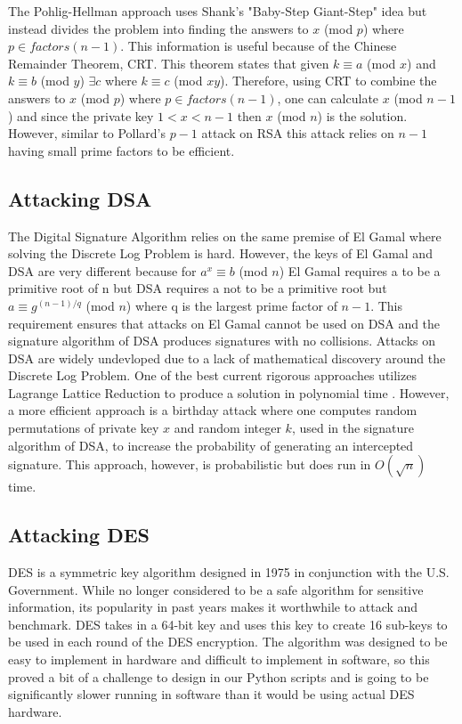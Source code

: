 \documentclass[12pt]{report}
\begin{document}
The Pohlig-Hellman approach uses Shank's "Baby-Step Giant-Step" idea but instead divides the problem into finding the answers to $x$ (mod $p$) where
$p \in factors(n-1)$. This information is useful because of the Chinese Remainder Theorem, CRT. This theorem states that given $k \equiv a$ (mod $x$) and
$k \equiv b$ (mod $y$) $\exists c$ where $k \equiv c$ (mod $xy$). Therefore, using CRT to combine the answers to $x$ (mod $p$) where $p \in factors(n-1)$, one can
calculate $x$ (mod $n-1$) and since the private key $1 < x < n-1$ then $x$ (mod $n$) is the solution. However, similar to Pollard's $p-1$ attack on RSA this attack
relies on $n-1$ having small prime factors to be efficient.

\subsection{Attacking DSA}
The Digital Signature Algorithm relies on the same premise of El Gamal where solving the Discrete Log Problem is hard. However, the keys of El Gamal and DSA are
very different because for $a^{x} \equiv b$ (mod $n$) El Gamal requires a to be a primitive root of n but DSA requires a not to be a primitive root but
$a \equiv g^{(n-1)/q}$ (mod $n$) where q is the largest prime factor of $n-1$. This requirement ensures that attacks on El Gamal cannot be used on DSA and the
signature algorithm of DSA produces signatures with no collisions. Attacks on DSA are widely undevloped due to a lack of mathematical discovery around the Discrete
Log Problem. One of the best current rigorous approaches utilizes Lagrange Lattice Reduction to produce a solution in polynomial time \cite{lattice}. However, a
more efficient approach is a birthday attack where one computes random permutations of private key $x$ and random integer $k$, used in the signature algorithm of
DSA, to increase the probability of generating an intercepted signature. This approach, however, is probabilistic but does run in $O(\sqrt{n})$ time.

\subsection{Attacking DES}
DES is a symmetric key algorithm designed in 1975 in conjunction with the U.S. Government. While no longer considered to be a safe algorithm for sensitive
information, its popularity in past years makes it worthwhile to attack and benchmark. DES takes in a 64-bit key and uses this key to create 16 sub-keys to be used
in each round of the DES encryption. The algorithm was designed to be easy to implement in hardware and difficult to implement in software, so this proved a bit of
a challenge to design in our Python scripts and is going to be significantly slower running in software than it would be using actual DES hardware.
\end{document}
